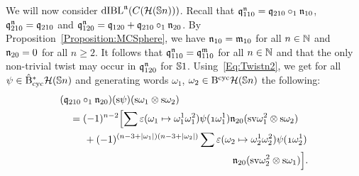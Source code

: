\documentclass[\MainFolder/Text.tex]{subfiles}
\begin{document}
We will now consider $\mathrm{dIBL}^{\mathfrak{n}}(C(\mathcal{H}(\mathbb{S}{n})))$. Recall that $\mathfrak{q}_{110}^{\mathfrak{n}} = \mathfrak{q}_{210}\circ_1 \mathfrak{n}_{10}$, $\mathfrak{q}_{210}^{\mathfrak{n}} = \mathfrak{q}_{210}$ and $\mathfrak{q}_{120}^{\mathfrak{n}} = \mathfrak{q}_{120} + \mathfrak{q}_{210}\circ_1 \mathfrak{n}_{20}$. By Proposition~\ref{Proposition:MCSphere}, we have $\mathfrak{n}_{10} = \mathfrak{m}_{10}$ for all $n\in \mathbb{N}$ and $\mathfrak{n}_{20} = 0$ for all $n\ge 2$. It follows that $\mathfrak{q}_{110}^{\mathfrak{n}} = \mathfrak{q}_{110}^{\mathfrak{m}}$ for all $n\in \mathbb{N}$ and that the only non-trivial twist may occur in $\mathfrak{q}_{120}^{\mathfrak{n}}$ for $\mathbb{S}{1}$. Using~\eqref{Eq:Twistn2}, we get for all $\psi\in \hat{\mathrm{B}}_{\mathrm{cyc}}^* \mathcal{H}(\mathbb{S}{n})$ and generating words $\omega_1$, $\omega_2 \in \mathrm{B}^{\mathrm{cyc}} \mathcal{H}(\mathbb{S}{n})$ the following:
\begin{equation}
\begin{aligned}
& (\OPQ_{210}\circ_1 \PMC_{20})(\Susp \psi)(\Susp \omega_1 \otimes \Susp \omega_2) \label{Eq:CoprodTwist}\\
& \quad = \begin{multlined}[t] (-1)^{n-2}\Bigl[ \sum \varepsilon(\omega_1 \mapsto \omega_1^1 \omega_1^2)\psi(\NOne \omega_1^1)\PMC_{20}(\Susp \NVol \omega_1^2 \otimes \Susp \omega_2) \\ {}+ (-1)^{(n-3+\Abs{\omega_1})(n-3+\Abs{\omega_2})} \sum \varepsilon(\omega_2 \mapsto \omega_2^1 \omega_2^2) \psi(\NOne \omega_2^1)  \\ \PMC_{20}(\Susp \NVol \omega_2^2 \otimes \Susp \omega_1)\Bigr].  \end{multlined}\end{aligned}
\end{equation}
\end{document}
